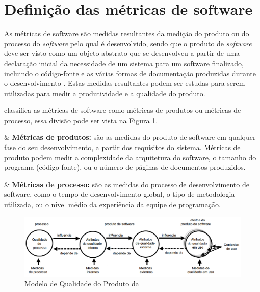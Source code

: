 
\section{Definição das métricas de software}

As métricas de software são medidas resultantes da medição do produto ou do processo do \textit{software} pelo qual é desenvolvido, sendo que o produto de \textit{software} deve ser visto como um objeto abstrato que se desenvolveu a partir de uma declaração inicial da necessidade de um sistema para um software finalizado, incluindo o código-fonte e as várias formas de documentação produzidas durante o desenvolvimento \cite{Mills:1999}. Estas medidas resultantes podem ser estudas para serem utilizadas para medir a produtividade e a qualidade do produto. 


 classifica as métricas de software como métricas de produtos ou métricas de processo, essa divisão pode ser vista na Figura \ref{modelodequalidade}. 

\begin{easylist}[itemize]	

& \textbf{Métricas de produtos:} são as medidas do produto de software em qualquer fase do seu desenvolvimento, a partir dos requisitos do sistema. Métricas de produto podem medir a complexidade da arquitetura do software, o tamanho do programa (código-fonte), ou o número de páginas de documentos produzidos. 

& \textbf{Métricas de processo:} são as medidas do processo de desenvolvimento de software, como o tempo de desenvolvimento global, o tipo de metodologia utilizada, ou o nível médio da experiência da equipe de programação.

\end{easylist}

\begin{figure}[h!]
\centering
\includegraphics[keepaspectratio=false,scale=0.55]{figuras/figuras_nilton/modeloqualidade.png}
\caption{Modelo de Qualidade do Produto da }
\label{modelodequalidade}
\end{figure}
\FloatBarrier

